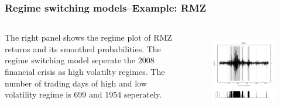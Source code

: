 \documentclass{beamer}
\newcommand\Fontviii{\fontsize{8}{9.2}\selectfont}
\begin{document}
\begin{frame}
\frametitle{Regime switching models--Example: RMZ}
\Fontviii

\begin{columns}[c] %

The right panel shows the regime plot of RMZ returns and its smoothed probabilities. The regime switching model seperate the 2008 financial crisis as high volatilty regimes. The number of trading days of high and low volatility regime is 699 and 1954 seperately.

\begin{figure}[h]
\centering 
\includegraphics[width=1\textwidth]{../results/regime/RMZ}
\label{fig: RMZregime}
\end{figure}
\end{columns}

\end{frame}

\end{document}
